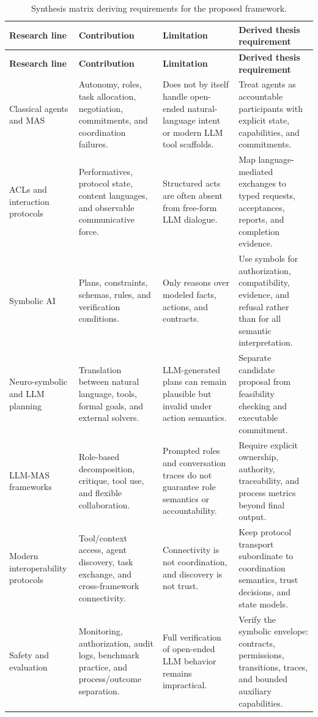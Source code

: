 \begingroup
\small
\setlength{\tabcolsep}{3pt}
\begin{longtable}{
>{\raggedright\arraybackslash}p{}
>{\raggedright\arraybackslash}p{}
>{\raggedright\arraybackslash}p{}
>{\raggedright\arraybackslash}p{}}
\caption{Synthesis matrix deriving requirements for the proposed framework.}
\label{tab:synthesis-matrix}\\
\toprule
\textbf{Research line} & \textbf{Contribution} & \textbf{Limitation} & \textbf{Derived thesis requirement} \\
\midrule
\endfirsthead
\toprule
\textbf{Research line} & \textbf{Contribution} & \textbf{Limitation} & \textbf{Derived thesis requirement} \\
\midrule
\endhead
Classical agents and MAS & Autonomy, roles, task allocation, negotiation, commitments, and coordination failures. & Does not by itself handle open-ended natural-language intent or modern LLM tool scaffolds. & Treat agents as accountable participants with explicit state, capabilities, and commitments. \\
ACLs and interaction protocols & Performatives, protocol state, content languages, and observable communicative force. & Structured acts are often absent from free-form LLM dialogue. & Map language-mediated exchanges to typed requests, acceptances, reports, and completion evidence. \\
Symbolic AI & Plans, constraints, schemas, rules, and verification conditions. & Only reasons over modeled facts, actions, and contracts. & Use symbols for authorization, compatibility, evidence, and refusal rather than for all semantic interpretation. \\
Neuro-symbolic and LLM planning & Translation between natural language, tools, formal goals, and external solvers. & LLM-generated plans can remain plausible but invalid under action semantics. & Separate candidate proposal from feasibility checking and executable commitment. \\
LLM-MAS frameworks & Role-based decomposition, critique, tool use, and flexible collaboration. & Prompted roles and conversation traces do not guarantee role semantics or accountability. & Require explicit ownership, authority, traceability, and process metrics beyond final output. \\
Modern interoperability protocols & Tool/context access, agent discovery, task exchange, and cross-framework connectivity. & Connectivity is not coordination, and discovery is not trust. & Keep protocol transport subordinate to coordination semantics, trust decisions, and state models. \\
Safety and evaluation & Monitoring, authorization, audit logs, benchmark practice, and process/outcome separation. & Full verification of open-ended LLM behavior remains impractical. & Verify the symbolic envelope: contracts, permissions, transitions, traces, and bounded auxiliary capabilities. \\
\bottomrule
\end{longtable}
\endgroup


